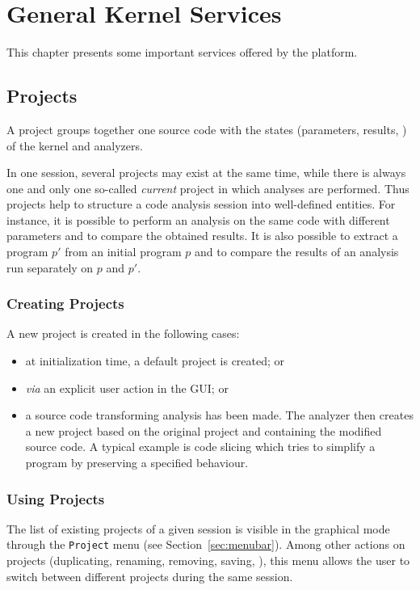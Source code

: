 \chapter{General Kernel Services}\label{user-services}

This chapter presents some important services offered by the \FramaC platform.

\section{Projects}\label{sec:project}

A \FramaC project groups together one source code with the states (parameters,
results, \etc) of the \FramaC kernel and analyzers.

In one \FramaC session, several projects may exist at the same time, while
there is always one and only one so-called \emph{current} project in which
analyses are performed.  Thus projects help to structure a code analysis
session into well-defined entities. For instance, it is possible to perform an
analysis on the same code with different parameters and to compare the obtained
results. It is also possible to extract a program $p'$ from an initial program
$p$ and to compare the results of an analysis run separately on $p$ and $p'$.

\subsection{Creating Projects}

A new project is created in the following cases:
\begin{itemize}
\item at initialization time, a default project is created; or
\item \emph{via} an explicit user action in the GUI; or
\item a source code transforming analysis has been made. The analyzer then
  creates a new project based on the original project and containing the
  modified source code. A typical example is code slicing which tries to
  simplify a program by preserving a specified behaviour.
\end{itemize}

\subsection{Using Projects}

The list of existing projects of a given session is visible in the graphical
mode through the \texttt{Project} menu (see Section~\ref{sec:menubar}). Among
other actions on projects (duplicating, renaming, removing, saving, \etc), this
menu allows the user to switch between different projects during the same
session.

